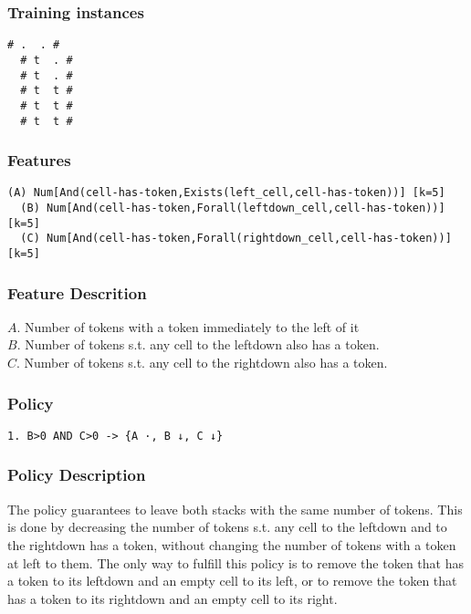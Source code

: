 \documentclass[a4paper]{article}
\begin{document}
\subsubsection{Training instances}
\begin{Verbatim}[fontsize=\footnotesize]
  # .  . #
  # t  . #
  # t  . #
  # t  t #
  # t  t #
  # t  t #
\end{Verbatim}

\subsubsection{Features}
\begin{Verbatim}[fontsize=\footnotesize]
  (A) Num[And(cell-has-token,Exists(left_cell,cell-has-token))] [k=5]
  (B) Num[And(cell-has-token,Forall(leftdown_cell,cell-has-token))] [k=5]
  (C) Num[And(cell-has-token,Forall(rightdown_cell,cell-has-token))] [k=5]
\end{Verbatim}

\subsubsection{Feature Descrition}
$A$. Number of tokens with a token immediately to the left of it\\
$B$. Number of tokens s.t. any cell to the leftdown also has a token.\\
$C$. Number of tokens s.t. any cell to the rightdown also has a token.

\subsubsection{Policy}
\begin{Verbatim}[fontsize=\footnotesize]
  1. B>0 AND C>0 -> {A ·, B ↓, C ↓}
\end{Verbatim}

\subsubsection{Policy Description}
The policy guarantees to leave both stacks with the same number of tokens. This is done by decreasing the number of tokens s.t. any cell to the leftdown and to the rightdown has a token, without changing the number of tokens with a token at left to them. The only way to fulfill this policy is to remove the token that has a token to its leftdown and an empty cell to its left, or to remove the token that has a token to its rightdown and an empty cell to its right.
\end{document}
